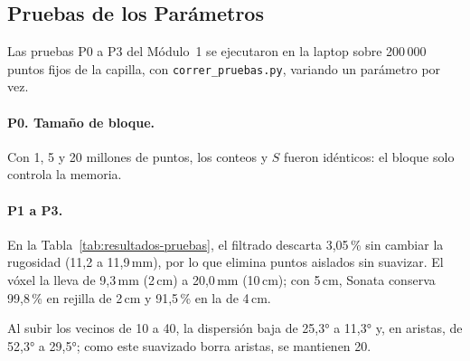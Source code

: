 \FloatBarrier
\subsection[Pruebas de los Parámetros]{Pruebas de los Parámetros}

Las pruebas P0 a P3 del Módulo~1 se ejecutaron en la laptop sobre 200\,000 puntos
fijos de la capilla, con \texttt{correr\_pruebas.py}, variando un parámetro por vez.

\paragraph*{P0. Tamaño de bloque.} Con 1, 5 y 20 millones de puntos, los conteos y
$S$ fueron idénticos: el bloque solo controla la memoria.

\paragraph*{P1 a P3.} En la Tabla~\ref{tab:resultados-pruebas}, el filtrado
descarta 3{,}05\,\% sin cambiar la rugosidad (11{,}2 a 11{,}9\,mm), por
lo que elimina puntos aislados sin suavizar. El vóxel la lleva de 9{,}3\,mm (2\,cm)
a 20{,}0\,mm (10\,cm); con 5\,cm, Sonata conserva 99{,}8\,\% en rejilla de 2\,cm y
91{,}5\,\% en la de 4\,cm.

Al subir los vecinos de 10 a 40, la dispersión baja de 25{,}3° a 11{,}3° y, en
aristas, de 52{,}3° a 29{,}5°; como este suavizado borra aristas, se mantienen 20.

